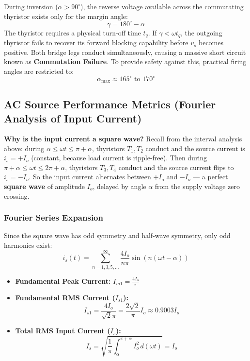 \documentclass[11pt,a4paper]{article}
\renewcommand{\boxed}[1]{#1}
\begin{document}
\begin{alertbox}
During inversion ($\alpha > 90^\circ$), the reverse voltage available across the commutating thyristor exists only for the margin angle:
\[
\gamma = 180^\circ - \alpha
\]
The thyristor requires a physical turn-off time $t_q$. If $\gamma < \omega t_q$, the outgoing thyristor fails to recover its forward blocking capability before $v_s$ becomes positive. Both bridge legs conduct simultaneously, causing a massive short circuit known as \textbf{Commutation Failure}. To provide safety against this, practical firing angles are restricted to:
\[
\alpha_{\max} \approx 165^\circ \text{ to } 170^\circ
\]
\end{alertbox}

\subsection{AC Source Performance Metrics (Fourier Analysis of Input Current)}

\textbf{Why is the input current a square wave?} Recall from the interval analysis above: during $\alpha \le \omega t \le \pi+\alpha$, thyristors $T_1, T_2$ conduct and the source current is $i_s = +I_o$ (constant, because load current is ripple-free). Then during $\pi+\alpha \le \omega t \le 2\pi+\alpha$, thyristors $T_3, T_4$ conduct and the source current flips to $i_s = -I_o$. So the input current alternates between $+I_o$ and $-I_o$ --- a perfect \textbf{square wave} of amplitude $I_o$, delayed by angle $\alpha$ from the supply voltage zero crossing.

\subsubsection{Fourier Series Expansion}
Since the square wave has odd symmetry and half-wave symmetry, only odd harmonics exist:
\[
i_s(t) = \sum_{n=1,3,5,\dots}^{\infty} \frac{4 I_o}{n \pi} \sin(n(\omega t - \alpha))
\]
\begin{itemize}[leftmargin=*]
  \item \textbf{Fundamental Peak Current:} $I_{m1} = \frac{4 I_o}{\pi}$
  \item \textbf{Fundamental RMS Current (\texorpdfstring{$I_{s1}$}{Is1}):}
  \[
  \boxed{I_{s1} = \frac{4 I_o}{\sqrt{2} \pi} = \frac{2\sqrt{2}}{\pi} I_o \approx 0.9003 I_o}
  \]
  \item \textbf{Total RMS Input Current (\texorpdfstring{$I_s$}{Is}):}
  \[
  \boxed{I_s = \sqrt{\frac{1}{\pi} \int_{\alpha}^{\pi+\alpha} I_o^2 \, d(\omega t)} = I_o}
  \]
\end{itemize}
\end{document}
